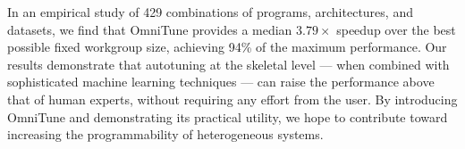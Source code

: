\documentclass[times, 10pt,twocolumn]{article}
\begin{document}
  In an empirical study of 429 combinations of programs, architectures,
  and datasets, we find that OmniTune provides a median $3.79\times$
  speedup over the best possible fixed workgroup size, achieving 94\% of
  the maximum performance. Our results demonstrate that autotuning at
  the skeletal level --- when combined with sophisticated machine
  learning techniques --- can raise the performance above that of human
  experts, without requiring any effort from the user. By introducing
  OmniTune and demonstrating its practical utility, we hope to
  contribute toward increasing the programmability of heterogeneous
  systems.

  \vspace{-1em}
  \printbibliography
\end{document}
